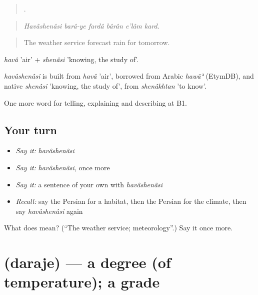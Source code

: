 \begin{quote}
     .
\end{quote}

\begin{quote}
\emph{Havâshenâsi barâ-ye fardâ bârân e'lâm kard.}
\end{quote}

\begin{quote}
The weather service forecast rain for tomorrow.
\end{quote}

\emph{havâ} 'air' + \emph{shenâsi} 'knowing, the study of'.

\begin{cousinweb}
\emph{havâshenâsi} is built from \emph{havâ} 'air', borrowed from Arabic \emph{hawāʾ} (EtymDB), and native \emph{shenâsi} 'knowing, the study of', from \emph{shenâkhtan} 'to know'.
\end{cousinweb}

\begin{grammarlens}[title={What you've built}]
One more word for telling, explaining and describing at B1.
\end{grammarlens}

\subsection*{Your turn}
\begin{itemize}
\raggedright
  \item \emph{Say it:} \emph{havâshenâsi}
  \item \emph{Say it:} \emph{havâshenâsi}, once more
  \item \emph{Say it:} a sentence of your own with \emph{havâshenâsi}
  \item \emph{Recall:} say the Persian for a habitat, then the Persian for the climate, then say \emph{havâshenâsi} again
\end{itemize}

\begin{tcolorbox}[breakable,colback=teal!4,colframe=teal!35!black,title={Before you move on}]
What does  mean? (\textquotedblleft{}The weather service; meteorology\textquotedblright{}.) Say it once more.
\end{tcolorbox}
\section[\texorpdfstring{\fa{درجه} (daraje)}{درجه (daraje)}]{ (daraje) — a degree (of temperature); a grade}

